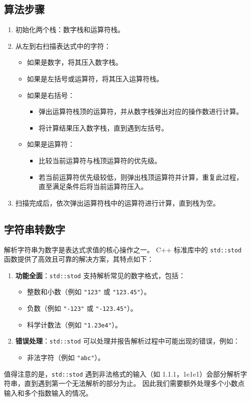 \documentclass[UTF8]{ctexart}
\begin{document}
\subsection{算法步骤}
\begin{enumerate}
    \item 初始化两个栈：数字栈和运算符栈。
    \item 从左到右扫描表达式中的字符：
    \begin{itemize}
        \item 如果是数字，将其压入数字栈。
        \item 如果是左括号或运算符，将其压入运算符栈。
        \item 如果是右括号：
        \begin{itemize}
            \item 弹出运算符栈顶的运算符，并从数字栈弹出对应的操作数进行计算。
            \item 将计算结果压入数字栈，直到遇到左括号。
        \end{itemize}
        \item 如果是运算符：
        \begin{itemize}
            \item 比较当前运算符与栈顶运算符的优先级。
            \item 若当前运算符优先级较低，则弹出栈顶运算符并计算，重复此过程，直至满足条件后将当前运算符压入。
        \end{itemize}
    \end{itemize}
    \item 扫描完成后，依次弹出运算符栈中的运算符进行计算，直到栈为空。
\end{enumerate}
\subsection{字符串转数字}
解析字符串为数字是表达式求值的核心操作之一。
C++ 标准库中的 \texttt{std::stod} 函数提供了高效且可靠的解决方案，其特点如下：
\begin{enumerate}
    \item \textbf{功能全面}：\texttt{std::stod} 支持解析常见的数字格式，包括：
    \begin{itemize}
        \item 整数和小数（例如 \texttt{"123"} 或 \texttt{"123.45"}）。
        \item 负数（例如 \texttt{"-123"} 或 \texttt{"-123.45"}）。
        \item 科学计数法（例如 \texttt{"1.23e4"}）。
    \end{itemize}
    \item \textbf{错误处理}：\texttt{std::stod} 可以处理并报告解析过程中可能出现的错误，例如：
    \begin{itemize}
        \item 非法字符（例如 \texttt{"abc"}）。
    \end{itemize}
\end{enumerate}
值得注意的是，\texttt{std::stod} 
遇到非法格式的输入（如 1.1.1，1e1e1）会部分解析字符串，直到遇到第一个无法解析的部分为止。
因此我们需要额外处理多个小数点输入和多个指数输入的情况。
\end{document}
